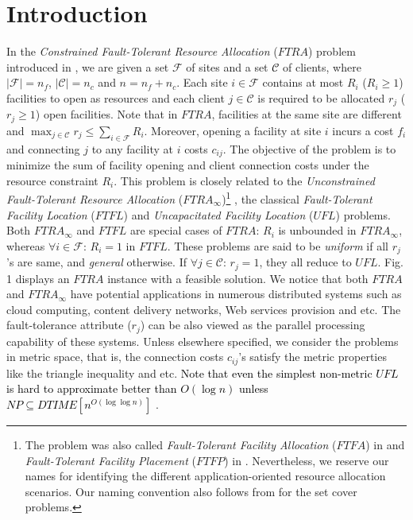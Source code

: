 \documentclass[10pt]{llncs}
\begin{document}
\section{Introduction}

In the \textit{Constrained Fault-Tolerant Resource Allocation} ($FTRA$)
problem introduced in \cite{kewen2011cocoon}, we are given a set
$\mathcal{F}$ of sites and a set \textcolor{black}{$\mathcal{C}$}
of clients, where $\left|\mathcal{F}\right|=n_{f}$, $\left|\mathcal{C}\right|=n_{c}$
and $n=n_{f}+n_{c}$. Each site $i\in\mathcal{F}$ contains at most
$R_{i}$ ($R_{i}\geq1$) facilities to open as resources and each
client $j\in\mathcal{C}$ is required to be allocated $r_{j}$ ($r_{j}\geq1$)
open facilities. Note that in $FTRA$, facilities at the same site
are different and $\max_{j\in\mathcal{C}}r_{j}\leq\sum_{i\in\mathcal{F}}R_{i}$.
Moreover, opening a facility at site $i$ incurs a cost $f_{i}$ and
connecting $j$ to any facility at $i$ costs $c_{ij}$. The objective
of the problem is to minimize the sum of facility opening and client
connection costs under the resource constraint $R_{i}$. This problem
is closely related to the \textit{Unconstrained Fault-Tolerant Resource
Allocation} ($FTRA_{\infty}$)\footnote{The problem was also called \textit{Fault-Tolerant Facility Allocation
}($FTFA$) in \cite{shihongftfa} and \textit{Fault-Tolerant Facility
Placement }($FTFP$) in \cite{yan2011approximation}. Nevertheless,
we reserve our names for identifying the different application-oriented
resource allocation scenarios. Our naming convention also follows
from \cite{fujito2005better,hua2009exact,kolliopoulos2003approximating}
for the set cover problems.} \cite{kewen2011cocoon}, the classical \textit{Fault-Tolerant Facility
Location }($FTFL$) \cite{Jain00FTFL} and\textit{ Uncapacitated Facility
Location }($UFL$) \cite{Shmoys97FL} problems. Both $FTRA_{\infty}$
and $FTFL$ are special cases of $FTRA$: $R_{i}$ is unbounded in
$FTRA_{\infty}$, whereas $\forall i\in\mathcal{F}:\, R_{i}=1$ in
$FTFL$. These problems are said to be \textit{uniform} if all $r_{j}$'s
are same, and\textit{ general} otherwise. If $\forall j\in\mathcal{C}:\, r_{j}=1$,
they all reduce to $UFL$. Fig. 1 displays an $FTRA$ instance with
a feasible solution. We notice that both $FTRA$ and $FTRA_{\infty}$
have potential applications in numerous distributed systems such as
cloud computing, content delivery networks, Web services provision
and etc. The fault-tolerance attribute ($r_{j}$) can be also viewed
as the parallel processing capability of these systems. Unless elsewhere
specified, we consider the problems in metric space, that is, the
connection costs $c_{ij}$'s satisfy the metric properties like the
triangle inequality and etc.\textcolor{black}{{} Note that even the
simplest non-metric $UFL$ is hard to approximate better than $O\left(\log n\right)$
unless $NP\subseteq DTIME\left[n^{O\left(\log\log n\right)}\right]$}
\cite{Sviridenko02improved1.58}.
\end{document}
